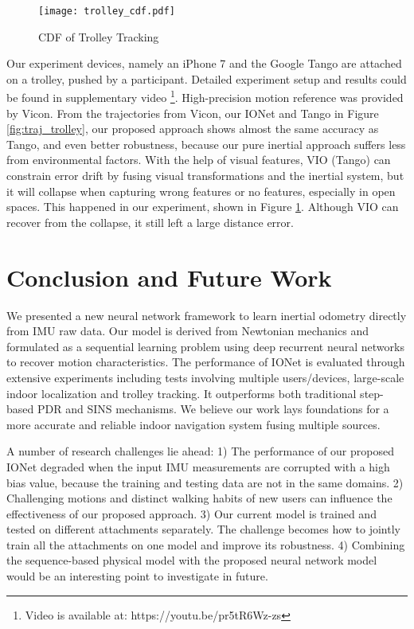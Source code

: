 \documentclass[letterpaper]{article}
\begin{document}
    \begin{figure}
    	\centering
        \texttt{[image: trolley\_cdf.pdf]}
        \caption{\label{fig:trolley_cdf}CDF of Trolley Tracking}
    \end{figure}  
    
    Our experiment devices, namely an iPhone 7 and the Google Tango are attached on a trolley, pushed by a participant. Detailed experiment setup and results could be found in supplementary video \footnote{Video is available at: https://youtu.be/pr5tR6Wz-zs}. High-precision motion reference was provided by Vicon. From the trajectories from Vicon, our IONet and Tango in Figure \ref{fig:traj_trolley}, our proposed approach shows almost the same accuracy as Tango, and even better robustness, because our pure inertial approach suffers less from environmental factors. With the help of visual features, VIO (Tango) can constrain error drift by fusing visual transformations and the inertial system, but it will collapse when capturing wrong features or no features, especially in open spaces. This happened in our experiment, shown in Figure \ref{fig:trolley_cdf}. Although VIO can recover from the collapse, it still left a large distance error.

\section{Conclusion and Future Work}

We presented a new neural network framework to learn inertial odometry directly from IMU raw data. Our model is derived from Newtonian mechanics and formulated as a sequential learning problem using deep recurrent neural networks to recover motion characteristics. The performance of IONet is evaluated through extensive experiments including tests involving multiple users/devices, large-scale indoor localization and trolley tracking. It outperforms both traditional step-based PDR and SINS mechanisms. We believe our work lays foundations for a more accurate and reliable indoor navigation system fusing multiple sources. 

A number of research challenges lie ahead: 1)  The performance of our proposed IONet degraded when the input IMU measurements are corrupted with a high bias value, because the training and testing data are not in the same domains. 2) Challenging motions and distinct walking habits of new users can influence the effectiveness of our proposed approach. 3) Our current model is trained and tested on different attachments separately. The challenge becomes how to jointly train all the attachments on one model and improve its robustness. 4) Combining the sequence-based physical model with the proposed neural network model would be an interesting point to investigate in future.
\end{document}
